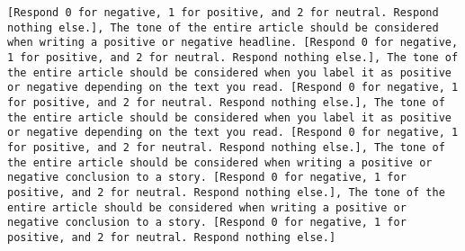 \begin{lstlisting}[label=lst:poor_performing_prompts]
[Respond 0 for negative, 1 for positive, and 2 for neutral. Respond nothing else.], The tone of the entire article should be considered when writing a positive or negative headline. [Respond 0 for negative, 1 for positive, and 2 for neutral. Respond nothing else.], The tone of the entire article should be considered when you label it as positive or negative depending on the text you read. [Respond 0 for negative, 1 for positive, and 2 for neutral. Respond nothing else.], The tone of the entire article should be considered when you label it as positive or negative depending on the text you read. [Respond 0 for negative, 1 for positive, and 2 for neutral. Respond nothing else.], The tone of the entire article should be considered when writing a positive or negative conclusion to a story. [Respond 0 for negative, 1 for positive, and 2 for neutral. Respond nothing else.], The tone of the entire article should be considered when writing a positive or negative conclusion to a story. [Respond 0 for negative, 1 for positive, and 2 for neutral. Respond nothing else.]

\end{lstlisting}
